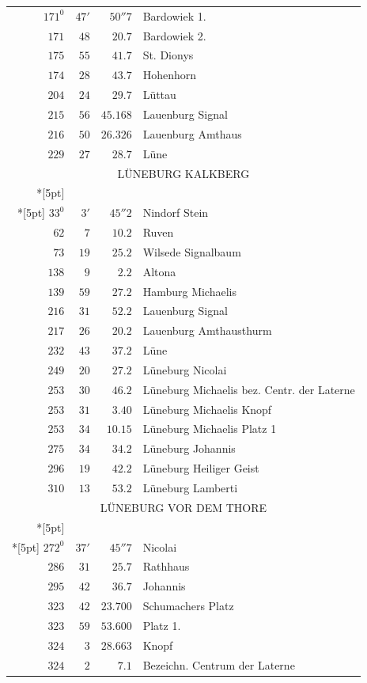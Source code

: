 \clearpage
{}%
\begingroup
\fontsize{10.5}{13}\selectfont
\setlength{\tabcolsep}{3pt}
\setlength{\LTpre}{2pt}
\setlength{\LTpost}{2pt}
\begin{longtable}{@{}rrrp{.61\linewidth}@{}}
\(171^{0}\)&\(47'\)&\(50''7\)&\raggedright Bardowiek 1.\tabularnewline
\(171\)&\(48\)&\(20.7\)&\raggedright Bardowiek 2.\tabularnewline
\(175\)&\(55\)&\(41.7\)&\raggedright St. Dionys\tabularnewline
\(174\)&\(28\)&\(43.7\)&\raggedright Hohenhorn\tabularnewline
\(204\)&\(24\)&\(29.7\)&\raggedright Lüttau\tabularnewline
\(215\)&\(56\)&\(45.168\)&\raggedright Lauenburg Signal\tabularnewline
\(216\)&\(50\)&\(26.326\)&\raggedright Lauenburg Amthaus\tabularnewline
\(229\)&\(27\)&\(28.7\)&\raggedright Lüne\tabularnewline
\multicolumn{4}{c}{\strut LÜNEBURG KALKBERG}\\*[5pt]
\multicolumn{4}{c}{\(-191511.038\)\qquad\(-30282.895\)}\\*[5pt]
\(33^{0}\)&\(3'\)&\(45''2\)&\raggedright Nindorf Stein\tabularnewline
\(62\)&\(7\)&\(10.2\)&\raggedright Ruven\tabularnewline
\(73\)&\(19\)&\(25.2\)&\raggedright Wilsede Signalbaum\tabularnewline
\(138\)&\(9\)&\(2.2\)&\raggedright Altona\tabularnewline
\(139\)&\(59\)&\(27.2\)&\raggedright Hamburg Michaelis\tabularnewline
\(216\)&\(31\)&\(52.2\)&\raggedright Lauenburg Signal\tabularnewline
\(217\)&\(26\)&\(20.2\)&\raggedright Lauenburg Amthausthurm\tabularnewline
\(232\)&\(43\)&\(37.2\)&\raggedright Lüne\tabularnewline
\(249\)&\(20\)&\(27.2\)&\raggedright Lüneburg Nicolai\tabularnewline
\(253\)&\(30\)&\(46.2\)&\raggedright Lüneburg Michaelis bez. Centr. der Laterne\tabularnewline
\(253\)&\(31\)&\(3.40\)&\raggedright Lüneburg Michaelis Knopf\tabularnewline
\(253\)&\(34\)&\(10.15\)&\raggedright Lüneburg Michaelis Platz 1\tabularnewline
\(275\)&\(34\)&\(34.2\)&\raggedright Lüneburg Johannis\tabularnewline
\(296\)&\(19\)&\(42.2\)&\raggedright Lüneburg Heiliger Geist\tabularnewline
\(310\)&\(13\)&\(53.2\)&\raggedright Lüneburg Lamberti\tabularnewline
\multicolumn{4}{c}{\strut LÜNEBURG VOR DEM THORE}\\*[5pt]
\multicolumn{4}{c}{\(-191882.273\)\qquad\(-30367.793\)}\\*[5pt]
\(272^{0}\)&\(37'\)&\(45''7\)&\raggedright Nicolai\tabularnewline
\(286\)&\(31\)&\(25.7\)&\raggedright Rathhaus\tabularnewline
\(295\)&\(42\)&\(36.7\)&\raggedright Johannis\tabularnewline
\(323\)&\(42\)&\(23.700\)&\raggedright Schumachers Platz\tabularnewline
\(323\)&\(59\)&\(53.600\)&\raggedright Platz 1.\tabularnewline
\(324\)&\(3\)&\(28.663\)&\raggedright Knopf\tabularnewline
\(324\)&\(2\)&\(7.1\)&\raggedright Bezeichn. Centrum der Laterne\tabularnewline

\end{longtable}
